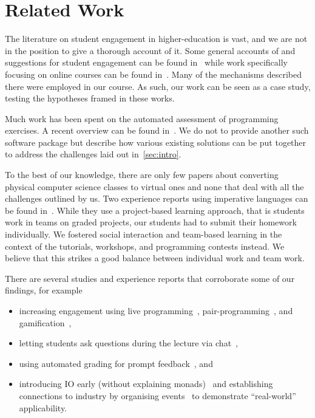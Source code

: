 \section{Related Work}\label{sec:related_work}

The literature on student engagement in higher-education is vast,
and we are not in the position to give a thorough account of it.
Some general accounts of and suggestions for
student engagement can be found in~\cite{student_engagement,engagementproposals}
while work specifically focusing on online courses can be found in~\cite{onlineengagement3,onlineengagement2,onlineengagement4,onlineengagement5,onlineengagement1}.
Many of the mechanisms described there were employed in our course.
As such, our work can be seen as a case study, testing the hypotheses framed in these works.

Much work has been spent on the
automated assessment of programming exercises.
A recent overview can be found in~\cite{automatedassessment}.
We do not to provide another such software package but
describe how various existing solutions
can be put together to
address the challenges laid out in~\cref{sec:intro}.

To the best of our knowledge,
there are only few papers about converting physical computer science classes to virtual ones
and none that deal with all the challenges outlined by us.
Two experience reports using imperative languages can be found in~\cite{largeprogrammingclass,onlinecourse1}.
While they use a project-based learning approach,
that is students work in teams on graded projects,
our students had to submit their homework individually.
We fostered social interaction and team-based learning
in the context of the tutorials, workshops,
and programming contests instead.
We believe that this strikes a good balance
between individual work and team work.

There are several studies and experience reports that corroborate some of our findings, for example
\begin{itemize}
  \item increasing engagement using live programming~\cite{fp_first_year_risks_benefits,livecoding1,livecoding2}, pair-programming~\cite{engagingprogramming,teaching_fp_first_year}, and gamification~\cite{soccerfun,teaching_fp_glossy_games,teaching_fp_macedonian},
  \item letting students ask questions during the lecture via chat~\cite{increase_interest_fp},
  \item using automated grading for prompt feedback~\cite{teaching_fp_glossy_games,teaching_art_fp_automated,teaching_fp_macedonian}, and
  \item introducing IO early (without explaining monads)~\cite{fp_first_year_risks_benefits,haskell_school_hudak,teaching_fp_chalmers} and establishing connections to industry by organising events~\cite{teaching_fp_chalmers} to demonstrate ``real-world'' applicability.
\end{itemize}

